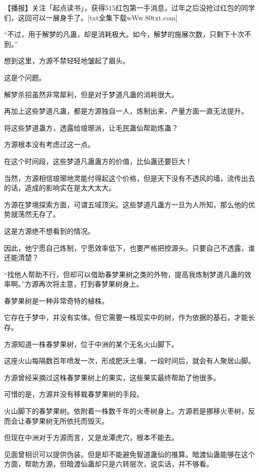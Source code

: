 
\begin{this_body}

【播报】关注「起点读书」，获得515红包第一手消息，过年之后没抢过红包的同学们，这回可以一展身手了。[txt全集下载wWw.80txt.com]

“不过，用于解梦的凡蛊，却是消耗极大。如今，解梦的施展次数，只剩下十次不到。”

想到这里，方源不禁轻轻地皱起了眉头。

这是个问题。

解梦杀招虽然非常犀利，但是对于梦道凡蛊的消耗很大。

再加上这些梦道凡蛊，都是方源独自一人，炼制出来，产量方面一直无法提升。

将这些梦道蛊方，透露给琅琊派，让毛民蛊仙帮助炼蛊？

方源根本没有考虑过这一点。

在这个时间段，这些梦道凡蛊蛊方的价值，比仙蛊还要巨大！

当然，方源相信琅琊地灵能付得起这个价格，但是天下没有不透风的墙，流传出去的话，造成的影响实在是太大太大。

方源在梦境探索方面，可谓五域顶尖。这些梦道凡蛊方一旦为人所知，那么他的优势就荡然无存了。

这是方源绝不想看到的情况。

因此，他宁愿自己炼制，宁愿效率低下，也要严格把控源头。只要自己不透露，谁还能清楚？

“找他人帮助不行，但却可以借助春梦果树之类的外物，提高我炼制梦道凡蛊的效率啊。”方源再次将主意，打到春梦果树身上。

春梦果树是一种非常奇特的植株。

它存在于梦中，并没有实体。但它需要一株现实中的树，作为依据的基石，才能长存。

方源知道一株春梦果树，位于中洲的某个无名火山脚下。

这座火山每隔数百年喷发一次，形成肥沃土壤，一段时间后，就会有人聚居山脚。

方源曾经采摘过这株春梦果树上的果实，这些果实最终帮助了他很多。

可惜的是，方源并没有移栽春梦果树的手段。

火山脚下的春梦果树。依附着一株数千年的火枣树身上。方源若是挪移火枣树，反而会让春梦果树无所依托而毁灭。

但现在中洲对于方源而言，又是龙潭虎穴，根本不能去。

见面曾相识可以提供伪装。但是却不能避免智道蛊仙的推算。暗渡仙蛊能够在这个方面，帮助方源，但暗渡仙蛊却只是六转层次，说实话，并不够看。


\end{this_body}
